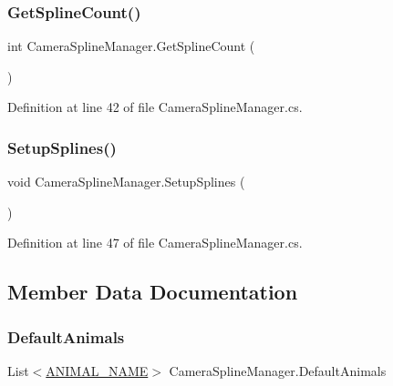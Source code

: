 \subsubsection{\texorpdfstring{Get\+Spline\+Count()}{GetSplineCount()}}
{\footnotesize\ttfamily int Camera\+Spline\+Manager.\+Get\+Spline\+Count (\begin{DoxyParamCaption}{ }\end{DoxyParamCaption})}



Definition at line 42 of file Camera\+Spline\+Manager.\+cs.

\mbox{\label{class_camera_spline_manager_abf91230d83f1513d0ad0fbd7d704aa27}} 
\subsubsection{\texorpdfstring{Setup\+Splines()}{SetupSplines()}}
{\footnotesize\ttfamily void Camera\+Spline\+Manager.\+Setup\+Splines (\begin{DoxyParamCaption}{ }\end{DoxyParamCaption})}



Definition at line 47 of file Camera\+Spline\+Manager.\+cs.



\subsection{Member Data Documentation}
\mbox{\label{class_camera_spline_manager_ae17109e2b520f17de66d50c373710513}} 
\subsubsection{\texorpdfstring{Default\+Animals}{DefaultAnimals}}
{\footnotesize\ttfamily List$<$\mbox{\hyperlink{_animal_8cs_a2fa5713399b84d1b88dae9196837af50}{A\+N\+I\+M\+A\+L\+\_\+\+N\+A\+ME}}$>$ Camera\+Spline\+Manager.\+Default\+Animals}



